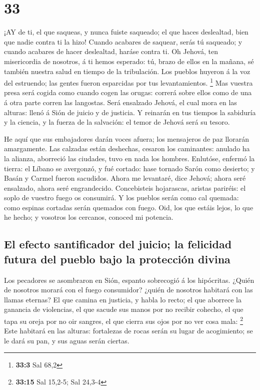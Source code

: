 \hypertarget{section-32}{%
\section{33}\label{section-32}}

 ¡AY de ti, el que saqueas, y nunca fuiste saqueado; el que
haces deslealtad, bien que nadie contra ti la hizo! Cuando acabares de
saquear, serás tú saqueado; y cuando acabares de hacer deslealtad,
haráse contra ti.  Oh Jehová, ten misericordia de nosotros,
á ti hemos esperado: tú, brazo de ellos en la mañana, sé también nuestra
salud en tiempo de la tribulación.  Los pueblos huyeron á la
voz del estruendo; las gentes fueron esparcidas por tus levantamientos.
\footnote{\textbf{33:3} Sal 68,2}  Mas vuestra presa será
cogida como cuando cogen las orugas: correrá sobre ellos como de una á
otra parte corren las langostas.  Será ensalzado Jehová, el
cual mora en las alturas: llenó á Sión de juicio y de justicia.
 Y reinarán en tus tiempos la sabiduría y la ciencia, y la
fuerza de la salvación: el temor de Jehová será su tesoro.

 He aquí que sus embajadores darán voces afuera; los
mensajeros de paz llorarán amargamente.  Las calzadas están
deshechas, cesaron los caminantes: anulado ha la alianza, aborreció las
ciudades, tuvo en nada los hombres.  Enlutóse, enfermó la
tierra: el Líbano se avergonzó, y fué cortado: hase tornado Sarón como
desierto; y Basán y Carmel fueron sacudidos.  Ahora me
levantaré, dice Jehová; ahora seré ensalzado, ahora seré engrandecido.
 Concebisteis hojarascas, aristas pariréis: el soplo de
vuestro fuego os consumirá.  Y los pueblos serán como cal
quemada: como espinas cortadas serán quemados con fuego. 
Oid, los que estáis lejos, lo que he hecho; y vosotros los cercanos,
conoced mi potencia.

\hypertarget{el-efecto-santificador-del-juicio-la-felicidad-futura-del-pueblo-bajo-la-protecciuxf3n-divina}{%
\subsection{El efecto santificador del juicio; la felicidad futura del
pueblo bajo la protección
divina}\label{el-efecto-santificador-del-juicio-la-felicidad-futura-del-pueblo-bajo-la-protecciuxf3n-divina}}

 Los pecadores se asombraron en Sión, espanto sobrecogió á
los hipócritas. ¿Quién de nosotros morará con el fuego consumidor?
¿quién de nosotros habitará con las llamas eternas?  El que
camina en justicia, y habla lo recto; el que aborrece la ganancia de
violencias, el que sacude sus manos por no recibir cohecho, el que tapa
su oreja por no oir sangres, el que cierra sus ojos por no ver cosa
mala: \footnote{\textbf{33:15} Sal 15,2-5; Sal 24,3-4} 
Este habitará en las alturas: fortalezas de rocas serán su lugar de
acogimiento; se le dará su pan, y sus aguas serán ciertas.

